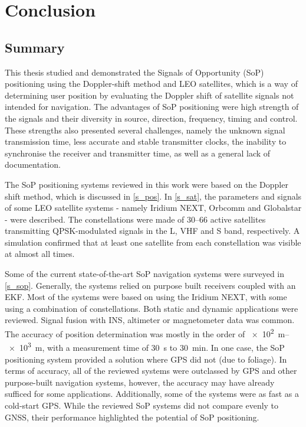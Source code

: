 \chapter{Conclusion}
\label{s_con}
\section{Summary}
This thesis studied and demonstrated the Signals of Opportunity (SoP) positioning using the Doppler-shift method and LEO satellites, which is a way of determining user position by evaluating the Doppler shift of satellite signals not intended for navigation. The advantages of SoP positioning were high strength of the signals and their diversity in source, direction, frequency, timing and control. These strengths also presented several challenges, namely the unknown signal transmission time, less accurate and stable transmitter clocks, the inability to synchronise the receiver and transmitter time, as well as a general lack of documentation.

The SoP positioning systems reviewed in this work were based on the Doppler shift method, which is discussed in \autoref{s_pos}. In \autoref{s_sat}, the parameters and signals of some LEO satellite systems - namely Iridium NEXT, Orbcomm and Globalstar - were described. The constellations were made of \numrange{30}{66} active satellites transmitting QPSK-modulated signals in the L, VHF and S band, respectively. A simulation confirmed that at least one satellite from each constellation was visible at almost all times.

Some of the current state-of-the-art SoP navigation systems were surveyed in \autoref{s_sop}. Generally, the systems relied on purpose built receivers coupled with an EKF. Most of the systems were based on using the Iridium NEXT, with some using a combination of constellations. Both static and dynamic applications were reviewed. Signal fusion with INS, altimeter or magnetometer data was common. The accuracy of position determination was mostly in the order of \qtyrange{e2}{e3}{\m}, with a measurement time of \qty{30}{s} to \qty{30}{min}. In one case, the SoP positioning system provided a solution where GPS did not (due to foliage).  In terms of accuracy, all of the reviewed systems were outclassed by GPS and other purpose-built navigation systems, however, the accuracy may have already sufficed for some applications. Additionally, some of the systems were as fast as a cold-start GPS. While the reviewed SoP systems did not compare
evenly to GNSS, their performance highlighted the potential of SoP positioning.

